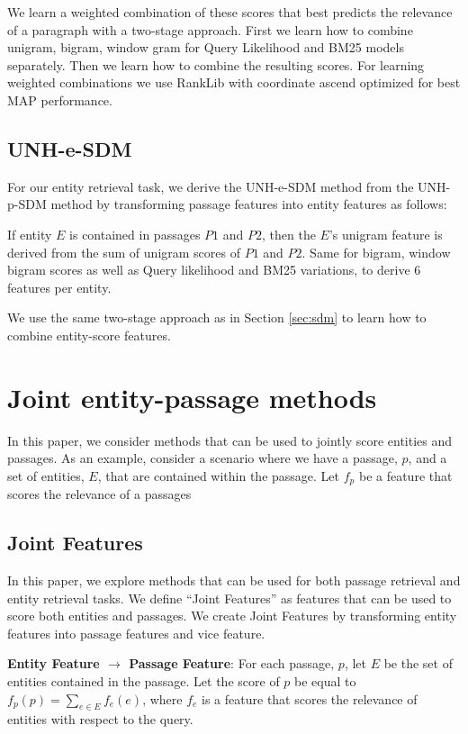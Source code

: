 \documentclass{article}
\begin{document}
We learn a weighted combination of these scores that best predicts the relevance of a paragraph with a two-stage approach. First we learn how to combine unigram, bigram, window gram for Query Likelihood and BM25 models separately. Then we learn how to combine the resulting scores. For learning weighted combinations we use RankLib with coordinate ascend optimized for best MAP performance.


\subsection{UNH-e-SDM}

For our entity retrieval task, we derive the UNH-e-SDM method from the UNH-p-SDM method by transforming passage features into entity features as follows:

If entity $E$ is contained in passages $P1$ and $P2$, then the $E$'s unigram feature is derived from the sum of unigram scores of $P1$ and $P2$. Same for bigram, window bigram scores as well as Query likelihood and BM25 variations, to derive 6 features per entity.

We use the same two-stage approach as in Section \ref{sec:sdm} to learn how to combine entity-score features.



\section{Joint entity-passage methods}

In this paper, we consider methods that can be used to jointly score entities and passages.
As an example, consider a scenario where we have a passage, $p$, and a set of entities, $E$, that are contained within the passage. Let $f_p$ be a feature that scores the relevance of a passages 

\subsection{Joint Features}\label{sec:joint}
In this paper, we explore methods that can be used for both passage retrieval and entity retrieval tasks.
We define ``Joint Features'' as features that can be used to score both entities and passages.
We create Joint Features by transforming entity features into passage features and vice feature.

\textbf{Entity Feature $\rightarrow$ Passage Feature}: For each passage, $p$, let $E$ be the set of entities contained in the passage. Let the score of $p$ be equal to $f_p(p) = \sum_{e \in E}{f_e(e)}$, where $f_e$ is a feature that scores the relevance of entities with respect to the query.
\end{document}
